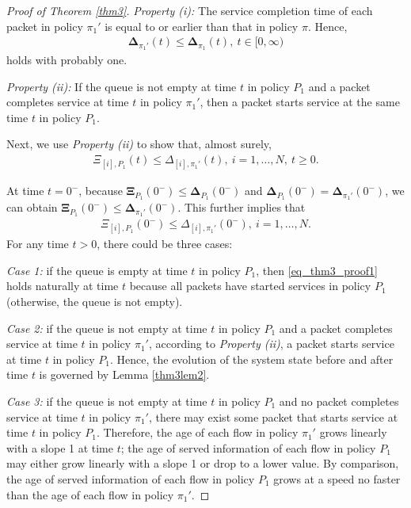 \begin{proof}[Proof of Theorem \ref{thm3}]
\emph{Property (i):} The service completion time of each packet in policy $\pi_1'$ is equal to or earlier than that in policy $\pi$. 
Hence, 
\begin{align}\label{eq_thm3_proof2}
\bm\Delta_{\pi_1'}(t) \leq \bm\Delta_{\pi_1}(t), ~t\in[0,\infty)
\end{align}
holds with probably one. 

\emph{Property (ii):} If the queue is not empty at time $t$ in policy $P_1$ and a packet completes service  at time $t$ in policy $\pi_1'$, then a packet starts service at the same time $t$ in policy $P_1$. 


Next, we use \emph{Property (ii)} to  show that, almost surely, 
\begin{align}\label{eq_thm3_proof1}
\Xi_{[i],P_1} (t) \leq \Delta_{[i],\pi_1'} (t),~i=1,\ldots,N,~t\geq 0.
\end{align}

At time $t= 0^-$, because $\bm\Xi_{P_1}(0^-) \leq \bm\Delta_{P_1}(0^-)$ and $\bm\Delta_{P_1}(0^-) = \bm\Delta_{\pi_1'}(0^-)$, we can obtain $\bm\Xi_{P_1}(0^-) \leq \bm\Delta_{\pi_1'}(0^-)$. This further implies that 
\begin{align}
\Xi_{[i],P_1} (0^-) \leq \Delta_{[i],\pi_1'} (0^-),~i=1,\ldots,N. 
\end{align}
For any time $t> 0$, there could be three cases:

\emph{Case 1:} if the queue is empty at time $t$ in policy $P_1$, then \eqref{eq_thm3_proof1} holds naturally at time $t$ because all packets have started services in policy $P_1$ (otherwise, the queue is not empty). 

\emph{Case 2:} if the queue is not empty at time $t$ in policy $P_1$ and a packet completes service at time $t$ in policy $\pi_1'$, according to \emph{Property (ii)}, a packet starts service at time $t$ in policy $P_1$. Hence, the evolution of the system state before and after time $t$ is governed by  Lemma \ref{thm3lem2}. 

\emph{Case 3:} if the queue is not empty at time $t$ in policy $P_1$ and no packet completes service at time $t$ in policy $\pi_1'$, there may exist some packet that starts service at time $t$ in policy $P_1$. Therefore, the age of each flow in policy $\pi_1'$  grows linearly with a slope 1 at time $t$; the age of served information of each flow in policy $P_1$ may either grow linearly with a slope 1 or drop to a lower value. By comparison, the age of served information of each flow in policy $P_1$ grows at a speed no faster than the age of each flow in policy $\pi_1'$.  


\end{proof}
